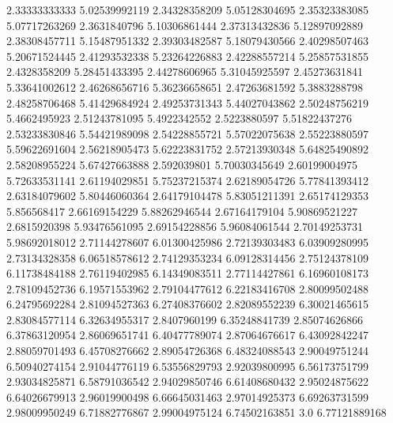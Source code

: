   2.33333333333    5.02539992119
  2.34328358209    5.05128304695
  2.35323383085    5.07717263269
   2.3631840796    5.10306861444
  2.37313432836    5.12897092889
  2.38308457711    5.15487951332
  2.39303482587    5.18079430566
  2.40298507463    5.20671524445
  2.41293532338    5.23264226883
  2.42288557214    5.25857531855
   2.4328358209    5.28451433395
  2.44278606965    5.31045925597
  2.45273631841    5.33641002612
  2.46268656716    5.36236658651
  2.47263681592     5.3883288798
  2.48258706468    5.41429684924
  2.49253731343    5.44027043862
  2.50248756219     5.4662495923
  2.51243781095     5.4922342552
   2.5223880597    5.51822437276
  2.53233830846    5.54421989098
  2.54228855721    5.57022075638
  2.55223880597    5.59622691604
  2.56218905473    5.62223831752
  2.57213930348    5.64825490892
  2.58208955224    5.67427663888
    2.592039801    5.70030345649
  2.60199004975    5.72633531141
  2.61194029851    5.75237215374
  2.62189054726    5.77841393412
  2.63184079602    5.80446060364
  2.64179104478    5.83051211391
  2.65174129353      5.856568417
  2.66169154229    5.88262946544
  2.67164179104    5.90869521227
   2.6815920398    5.93476561095
  2.69154228856    5.96084061544
  2.70149253731    5.98692018012
  2.71144278607    6.01300425986
  2.72139303483    6.03909280995
  2.73134328358    6.06518578612
  2.74129353234    6.09128314456
  2.75124378109    6.11738484188
  2.76119402985    6.14349083511
  2.77114427861    6.16960108173
  2.78109452736    6.19571553962
  2.79104477612    6.22183416708
  2.80099502488    6.24795692284
  2.81094527363    6.27408376602
  2.82089552239    6.30021465615
  2.83084577114    6.32634955317
   2.8407960199    6.35248841739
  2.85074626866    6.37863120954
  2.86069651741    6.40477789074
  2.87064676617    6.43092842247
  2.88059701493    6.45708276662
  2.89054726368    6.48324088543
  2.90049751244    6.50940274154
  2.91044776119    6.53556829793
  2.92039800995    6.56173751799
  2.93034825871    6.58791036542
  2.94029850746    6.61408680432
  2.95024875622    6.64026679913
  2.96019900498    6.66645031463
  2.97014925373    6.69263731599
  2.98009950249    6.71882776867
  2.99004975124    6.74502163851
            3.0    6.77121889168

